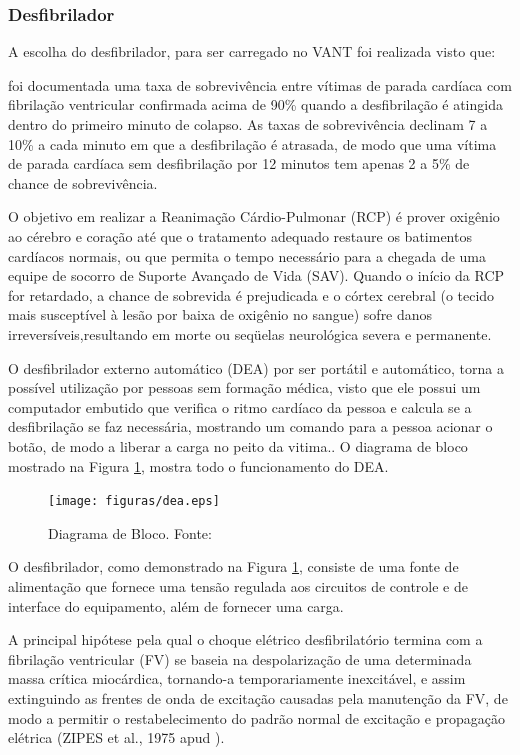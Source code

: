 \subsubsection{Desfibrilador}

A escolha do desfibrilador, para ser carregado no VANT foi realizada visto que:

\begin{citacao}
foi documentada uma taxa de 
sobrevivência entre vítimas de parada cardíaca com fibrilação ventricular confirmada acima de 90\% quando a desfibrilação é atingida
dentro do primeiro minuto de colapso. As taxas de sobrevivência declinam 7 a 10\% a cada minuto em que a desfibrilação
é atrasada, de modo que uma vítima de parada cardíaca sem desfibrilação por 12 minutos tem apenas 2 a 5\%
de chance de sobrevivência.\cite{1}
\end{citacao}

O objetivo em realizar a Reanimação Cárdio-Pulmonar (RCP) é prover oxigênio ao cérebro e coração até que
o tratamento adequado restaure os batimentos cardíacos normais, ou que permita o tempo necessário para a 
chegada de uma equipe de socorro de Suporte Avançado de Vida (SAV). Quando o início da RCP for retardado, 
a chance de sobrevida é prejudicada e o córtex cerebral (o tecido mais susceptível à lesão por baixa de 
oxigênio no sangue) sofre danos irreversíveis,resultando em morte ou seqüelas neurológica severa e permanente. \cite{2}

O desfibrilador externo automático (DEA) por ser portátil e automático, torna a possível utilização por 
pessoas sem formação médica, visto que ele possui um computador embutido que verifica o ritmo cardíaco da 
pessoa e calcula se a desfibrilação se faz necessária, mostrando um comando para a pessoa acionar o botão, de 
modo a liberar a carga no peito da vitima.\cite{3}. O diagrama de bloco mostrado na Figura \ref{fig:dea}, mostra todo o funcionamento do DEA.

\begin{figure}[h!]
	\centering
	  \texttt{[image: figuras/dea.eps]}
	\caption{Diagrama de Bloco. Fonte: \cite{bloco}}
	\label{fig:dea}
\end{figure}

O desfibrilador, como demonstrado na Figura \ref{fig:dea}, consiste de uma fonte  de alimentação que 
fornece uma tensão regulada aos circuitos de controle e de interface do equipamento, além de fornecer uma carga.

A principal hipótese pela qual o choque elétrico desfibrilatório termina com a fibrilação ventricular (FV) se
baseia na despolarização de uma determinada massa crítica miocárdica, tornando-a temporariamente inexcitável, e
assim extinguindo as frentes de onda de excitação causadas pela manutenção da FV, de modo a permitir o 
restabelecimento do padrão normal de excitação e propagação elétrica (ZIPES et al., 1975 apud ).

